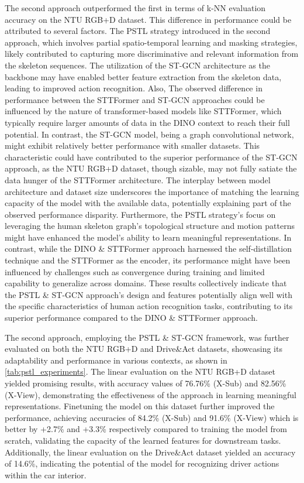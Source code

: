 The second approach outperformed the first in terms of k-NN evaluation accuracy on the NTU RGB+D dataset. This difference in performance could be attributed to several factors. The PSTL strategy introduced in the second approach, which involves partial spatio-temporal learning and masking strategies, likely contributed to capturing more discriminative and relevant information from the skeleton sequences. The utilization of the ST-GCN architecture as the backbone may have enabled better feature extraction from the skeleton data, leading to improved action recognition. Also, The observed difference in performance between the STTFormer and ST-GCN approaches could be influenced by the nature of transformer-based models like STTFormer, which typically require larger amounts of data in the DINO context to reach their full potential. In contrast, the ST-GCN model, being a graph convolutional network, might exhibit relatively better performance with smaller datasets. This characteristic could have contributed to the superior performance of the ST-GCN approach, as the NTU RGB+D dataset, though sizable, may not fully satiate the data hunger of the STTFormer architecture. The interplay between model architecture and dataset size underscores the importance of matching the learning capacity of the model with the available data, potentially explaining part of the observed performance disparity. Furthermore, the PSTL strategy's focus on leveraging the human skeleton graph's topological structure and motion patterns might have enhanced the model's ability to learn meaningful representations. In contrast, while the DINO \& STTFormer approach harnessed the self-distillation technique and the STTFormer as the encoder, its performance might have been influenced by challenges such as convergence during training and limited capability to generalize across domains. These results collectively indicate that the PSTL \& ST-GCN approach's design and features potentially align well with the specific characteristics of human action recognition tasks, contributing to its superior performance compared to the DINO \& STTFormer approach.


The second approach, employing the PSTL \& ST-GCN framework, was further evaluated on both the NTU RGB+D and Drive\&Act datasets, showcasing its adaptability and performance in various contexts, as shown in \ref{tab:pstl_experiments}. The linear evaluation on the NTU RGB+D dataset yielded promising results, with accuracy values of 76.76\% (X-Sub) and 82.56\% (X-View), demonstrating the effectiveness of the approach in learning meaningful representations. Finetuning the model on this dataset further improved the performance, achieving accuracies of 84.2\% (X-Sub) and 91.6\% (X-View) which is better by +2.7\% and +3.3\% respectively compared to training the model from scratch, validating the capacity of the learned features for downstream tasks. Additionally, the linear evaluation on the Drive\&Act dataset yielded an accuracy of 14.6\%, indicating the potential of the model for recognizing driver actions within the car interior.

